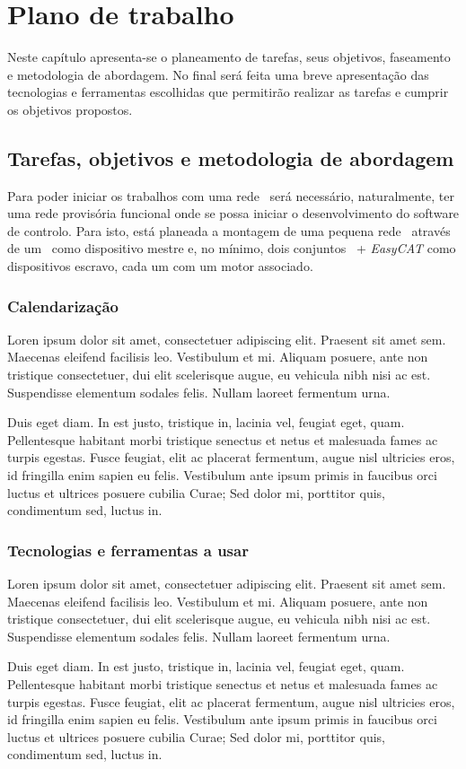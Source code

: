 \chapter{Plano de trabalho}\label{chap:chap3}

Neste capítulo apresenta-se o planeamento de tarefas, seus objetivos,
faseamento e metodologia de abordagem. No final será feita uma breve
apresentação das tecnologias e ferramentas escolhidas que permitirão
realizar as tarefas e cumprir os objetivos propostos.


\section{Tarefas, objetivos e metodologia de abordagem}

Para poder iniciar os trabalhos com uma rede \ecat\, será necessário,
naturalmente, ter uma rede provisória funcional onde se possa iniciar o
desenvolvimento do software de controlo. Para isto, está planeada a
montagem de uma pequena rede \ecat\ através de um \raspi\ como dispositivo
mestre e, no mínimo, dois conjuntos \arduino\ + \emph{EasyCAT} como
dispositivos escravo, cada um com um motor associado.


\subsection{Calendarização}

Loren ipsum dolor sit amet, consectetuer adipiscing elit. 
Praesent sit amet sem. Maecenas eleifend facilisis leo. Vestibulum et
mi. Aliquam posuere, ante non tristique consectetuer, dui elit
scelerisque augue, eu vehicula nibh nisi ac est. Suspendisse elementum
sodales felis. Nullam laoreet fermentum urna. 

Duis eget diam. In est justo, tristique in, lacinia vel, feugiat eget,
quam. Pellentesque habitant morbi tristique senectus et netus et
malesuada fames ac turpis egestas. Fusce feugiat, elit ac placerat
fermentum, augue nisl ultricies eros, id fringilla enim sapien eu
felis. Vestibulum ante ipsum primis in faucibus orci luctus et
ultrices posuere cubilia Curae; Sed dolor mi, porttitor quis,
condimentum sed, luctus in. 


\subsection{Tecnologias e ferramentas a usar}
Loren ipsum dolor sit amet, consectetuer adipiscing elit. 
Praesent sit amet sem. Maecenas eleifend facilisis leo. Vestibulum et
mi. Aliquam posuere, ante non tristique consectetuer, dui elit
scelerisque augue, eu vehicula nibh nisi ac est. Suspendisse elementum
sodales felis. Nullam laoreet fermentum urna. 

Duis eget diam. In est justo, tristique in, lacinia vel, feugiat eget,
quam. Pellentesque habitant morbi tristique senectus et netus et
malesuada fames ac turpis egestas. Fusce feugiat, elit ac placerat
fermentum, augue nisl ultricies eros, id fringilla enim sapien eu
felis. Vestibulum ante ipsum primis in faucibus orci luctus et
ultrices posuere cubilia Curae; Sed dolor mi, porttitor quis,
condimentum sed, luctus in. 
